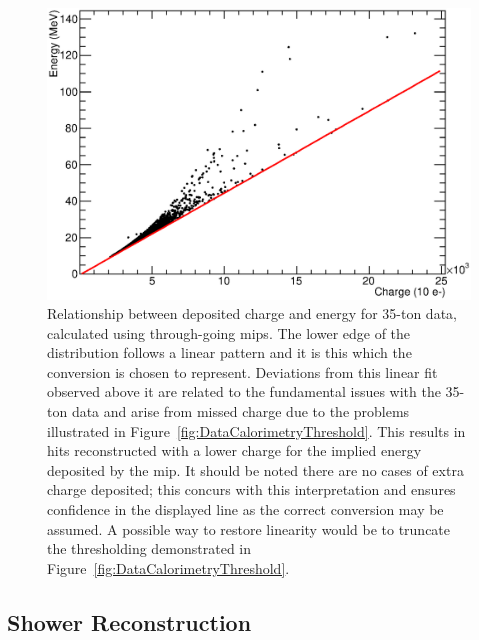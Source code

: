 \begin{figure}
  \centering
  \includegraphics[width=12cm]{ChargeEnergy.eps}
  \caption[Relationship between deposited charge and energy for 35-ton data, calculated using through-going mips.]{Relationship between deposited charge and energy for 35-ton data, calculated using through-going mips.  The lower edge of the distribution follows a linear pattern and it is this which the conversion is chosen to represent.  Deviations from this linear fit observed above it are related to the fundamental issues with the 35-ton data and arise from missed charge due to the problems illustrated in Figure~\ref{fig:DataCalorimetryThreshold}.  This results in hits reconstructed with a lower charge for the implied energy deposited by the mip.  It should be noted there are no cases of extra charge deposited; this concurs with this interpretation and ensures confidence in the displayed line as the correct conversion may be assumed.  A possible way to restore linearity would be to truncate the thresholding demonstrated in Figure~\ref{fig:DataCalorimetryThreshold}.}
  \label{fig:DataShowerEnergyConversion}
\end{figure}

\subsection{Shower Reconstruction}\label{sec:DataShowerReconstruction}


